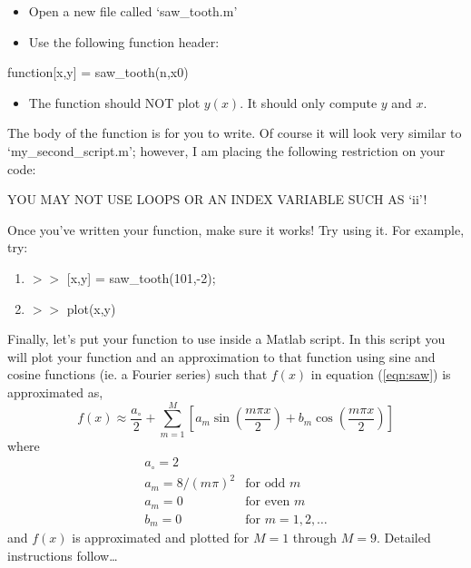 \documentclass[letter]{article}
\begin{document}
\begin{itemize}
\item Open a new file called `saw\_tooth.m'
\item Use the following function header:
\end{itemize}

\centerline{function[x,y] = saw\_tooth(n,x0)}
\vspace{.5cm}

\begin{itemize}
\item The function should NOT plot $y(x)$.  It should only compute $y$
  and $x$.
\end{itemize}

The body of the function is for you to write.  Of course it will look
very similar to `my\_second\_script.m'; however, I am placing the
following restriction on your code:\\

\centerline{YOU MAY NOT USE LOOPS OR AN INDEX VARIABLE SUCH AS `ii'!}
\vspace{0.5cm}

Once you've written your function, make sure it works!  Try using
it.  For example, try:

\begin{enumerate}
\small
\item $>>$ [x,y] = saw\_tooth(101,-2);
\item $>>$ plot(x,y)
\end{enumerate}

Finally, let's put your function to use inside a Matlab script.  In
this script you will plot your function and an approximation to that
function using sine and cosine functions (ie. a Fourier
series) such that $f(x)$ in equation (\ref{eqn:saw}) is approximated
as,
\begin{displaymath}
  f(x) \approx \frac{a_\circ}{2} + \sum_{m=1}^{M}\left[a_m\sin\left(\frac{m\pi
  x}{2}\right) + b_m\cos\left(\frac{m\pi x}{2}\right)\right]
\end{displaymath}
where
\begin{displaymath}
\begin{array}{ll}
a_\circ = 2 \\
a_m = 8/\left(m\pi\right)^2 & \text{for odd } m \\
a_m = 0 & \text{for even } m \\
b_m = 0 & \text{for } m=1,2,\ldots
\end{array}
\end{displaymath}
and $f(x)$ is approximated and plotted for $M=1$ through $M=9$.
Detailed instructions follow\ldots
\end{document}

